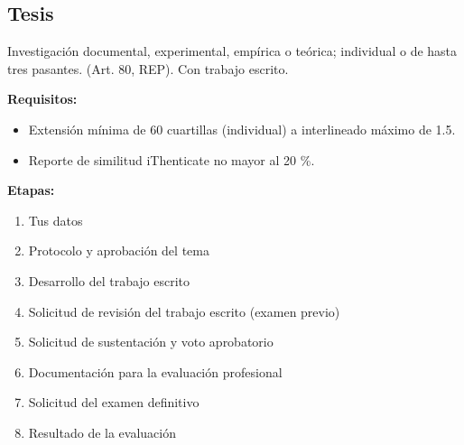 \subsection{Tesis}
Investigación documental, experimental, empírica o teórica; individual o de hasta tres pasantes. (Art. 80, REP). Con trabajo escrito.

\textbf{Requisitos:}
\begin{itemize}
  \item Extensión mínima de 60 cuartillas (individual) a interlineado máximo de 1.5.
  \item Reporte de similitud iThenticate no mayor al 20 \%.
\end{itemize}
\textbf{Etapas:}
\begin{enumerate}
  \item Tus datos
  \item Protocolo y aprobación del tema
  \item Desarrollo del trabajo escrito
  \item Solicitud de revisión del trabajo escrito (examen previo)
  \item Solicitud de sustentación y voto aprobatorio
  \item Documentación para la evaluación profesional
  \item Solicitud del examen definitivo
  \item Resultado de la evaluación
\end{enumerate}
